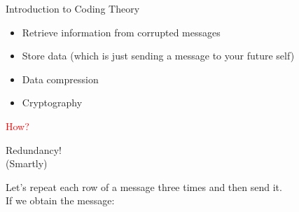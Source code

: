 \begin{frame}{Introduction to Coding Theory}

    \begin{itemize}
        \item Retrieve information from corrupted messages \pause
        \item Store data (which is just sending a message to your future self) \pause
        \item Data compression \pause
        \item Cryptography 
    \end{itemize}
\end{frame}
\begin{frame}

    \vspace{-2cm} %
    \hspace{2.3cm}\textcolor{red}{How?} \pause 
    \begin{center}
        \alert<1>{\Huge Redundancy!} \\ \pause
        \alert<3>{\huge (Smartly)}
    \end{center}
    \pause
    Let's repeat each row of a message three times and then send it.\\ \pause
    If we obtain the message:
    \pause
    
\end{frame}
